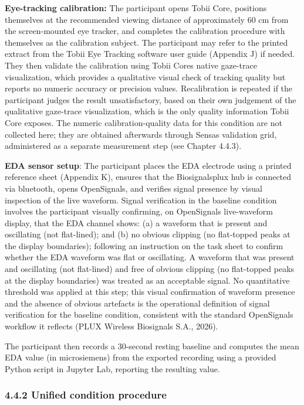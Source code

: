 \documentclass[
]{article}
\begin{document}
\textbf{Eye-tracking calibration:} The participant opens Tobii Core, positions themselves at the recommended viewing distance of approximately 60 cm from the screen-mounted eye tracker, and completes the calibration procedure with themselves as the calibration subject. The participant may refer to the printed extract from the Tobii Eye Tracking software user guide (Appendix J) if needed. They then validate the calibration using Tobii Core\textquotesingle s native gaze-trace visualization, which provides a qualitative visual check of tracking quality but reports no numeric accuracy or precision values. Recalibration is repeated if the participant judges the result unsatisfactory, based on their own judgement of the qualitative gaze-trace visualization, which is the only quality information Tobii Core exposes. The numeric calibration-quality data for this condition are not collected here; they are obtained afterwards through Sensa\textquotesingle s validation grid, administered as a separate measurement step (see Chapter 4.4.3).

\textbf{EDA sensor setup}: The participant places the EDA electrode using a printed reference sheet (Appendix K), ensures that the Biosignalsplux hub is connected via bluetooth, opens OpenSignals, and verifies signal presence by visual inspection of the live waveform. Signal verification in the baseline condition involves the participant visually confirming, on OpenSignals\textquotesingle{} live-waveform display, that the EDA channel shows: (a) a waveform that is present and oscillating (not flat-lined); and (b) no obvious clipping (no flat-topped peaks at the display boundaries); following an instruction on the task sheet to confirm whether the EDA waveform was flat or oscillating. A waveform that was present and oscillating (not flat-lined) and free of obvious clipping (no flat-topped peaks at the display boundaries) was treated as an acceptable signal. No quantitative threshold was applied at this step; this visual confirmation of waveform presence and the absence of obvious artefacts is the operational definition of signal verification for the baseline condition, consistent with the standard OpenSignals workflow it reflects (PLUX Wireless Biosignals S.A., 2026).

The participant then records a 30-second resting baseline and computes the mean EDA value (in microsiemens) from the exported recording using a provided Python script in Jupyter Lab, reporting the resulting value.

\hypertarget{unified-condition-procedure}{%
\subsubsection{4.4.2 Unified condition procedure}\label{unified-condition-procedure}}
\end{document}
